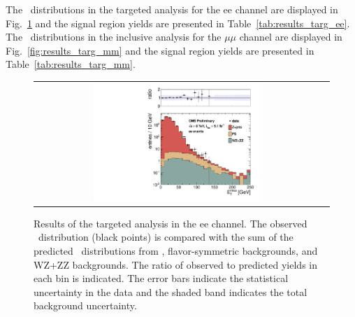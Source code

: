\clearpage

The \MET\ distributions in the targeted analysis for the ee channel are displayed in Fig.~\ref{fig:results_targ_ee} and 
the signal region yields are presented in Table~\ref{tab:results_targ_ee}.
The \MET\ distributions in the inclusive analysis for the $\mu\mu$ channel are displayed in Fig.~\ref{fig:results_targ_mm} and 
the signal region yields are presented in Table~\ref{tab:results_targ_mm}.

\begin{figure}[!h]
\begin{center}
\begin{tabular}{cc}
\includegraphics[width=0.6\textwidth]{plots/met_bveto_1.pdf}
\end{tabular}
\caption{Results of the targeted analysis in the ee channel. The observed \MET\ distribution (black points) is compared with the sum of the predicted \MET\
distributions from \zjets, flavor-symmetric backgrounds, and WZ+ZZ backgrounds. The ratio of observed to predicted yields in each bin is
indicated. The error bars indicate the statistical uncertainty in the data and the shaded band indicates the total background uncertainty.
\label{fig:results_targ_ee}
}
\end{center}
\end{figure}



